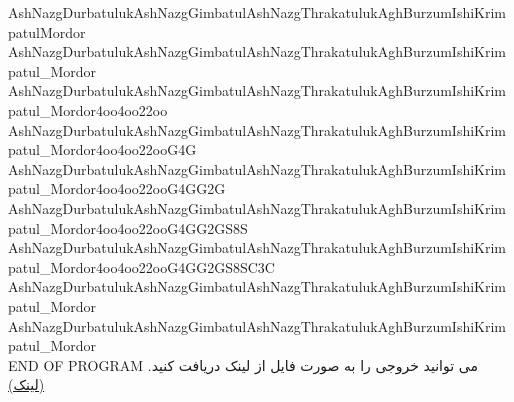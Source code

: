 \documentclass[]{article}
\begin{document}
{{AshNazgDurbatulukAshNazgGimbatulAshNazgThrakatulukAghBurzumIshiKrimpatulMordor\\
AshNazgDurbatulukAshNazgGimbatulAshNazgThrakatulukAghBurzumIshiKrimpatul\_Mordor\\
AshNazgDurbatulukAshNazgGimbatulAshNazgThrakatulukAghBurzumIshiKrimpatul\_Mordor4oo4oo22oo
AshNazgDurbatulukAshNazgGimbatulAshNazgThrakatulukAghBurzumIshiKrimpatul\_Mordor4oo4oo22ooG4G\\
AshNazgDurbatulukAshNazgGimbatulAshNazgThrakatulukAghBurzumIshiKrimpatul\_Mordor4oo4oo22ooG4GG2G\\
AshNazgDurbatulukAshNazgGimbatulAshNazgThrakatulukAghBurzumIshiKrimpatul\_Mordor4oo4oo22ooG4GG2GS8S\\
AshNazgDurbatulukAshNazgGimbatulAshNazgThrakatulukAghBurzumIshiKrimpatul\_Mordor4oo4oo22ooG4GG2GS8SC3C\\
AshNazgDurbatulukAshNazgGimbatulAshNazgThrakatulukAghBurzumIshiKrimpatul\_Mordor\\
AshNazgDurbatulukAshNazgGimbatulAshNazgThrakatulukAghBurzumIshiKrimpatul\_Mordor\\}
END OF PROGRAM
}
می توانید خروجی را به صورت فایل از لینک دریافت کنید.  \href{https://drive.google.com/open?id=1xizAD0Ctv0SDGLtcc-7iAhKyuIbDXtSN}{(لینک)}
\end{document}
